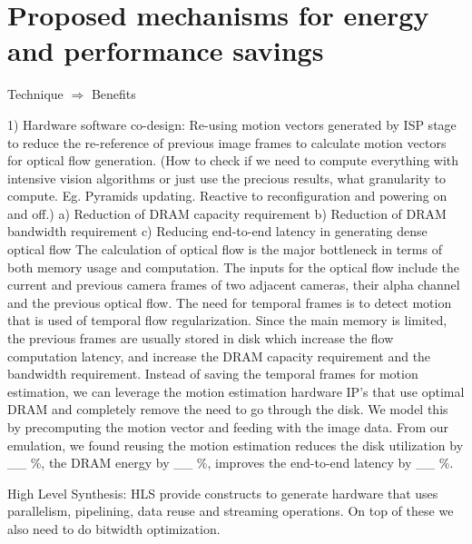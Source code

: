 \chapter{Proposed mechanisms for energy and performance savings}

	Technique $\Rightarrow$ Benefits  \newline

1) Hardware software co-design: Re-using motion vectors generated by ISP stage to reduce the re-reference of previous image frames to calculate motion vectors for optical flow generation.\newline
(How to check if we need to compute everything with intensive vision algorithms or just use the precious results, what granularity to compute. Eg. Pyramids updating. Reactive to reconfiguration and powering on and off.)\newline
	a) Reduction of DRAM capacity requirement\newline
	b) Reduction of DRAM bandwidth requirement\newline
	c) Reducing end-to-end latency in generating dense optical flow \newline
The calculation of optical flow is the major bottleneck in terms of both memory usage and computation. The inputs for the optical flow include the current and previous camera frames of two adjacent cameras, their alpha channel and the previous optical flow. The need for temporal frames is to detect motion that is used of temporal flow regularization. Since the main memory is limited, the previous frames are usually stored in disk which increase the flow computation latency, and increase the DRAM capacity requirement and the bandwidth requirement. Instead of saving the temporal frames  for motion estimation, we can leverage the motion estimation hardware IP's that use optimal DRAM and completely remove the need to go through the disk. We model this by precomputing the motion vector and feeding with the image data. From our emulation, we found reusing the motion estimation reduces the disk utilization by \_\_ \%, the DRAM energy by \_\_ \%, improves the end-to-end latency by \_\_ \%. 
\newline

High Level Synthesis: HLS provide constructs to generate hardware that uses parallelism, pipelining, data reuse and streaming operations. On top of these we also need to do bitwidth optimization. 

